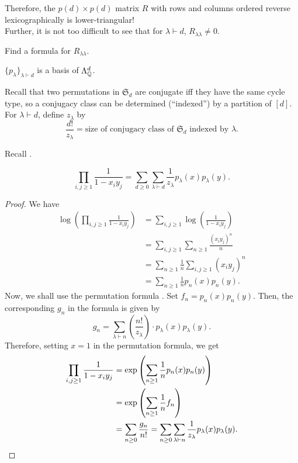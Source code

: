 	Therefore, the $p(d) \times p(d)$ matrix $R$ with rows and columns ordered reverse lexicographically is lower-triangular!\\
	Further, it is not too difficult to see that for $\lambda \vdash d$, $R_{\lambda\lambda} \ne 0$.
	
	\begin{exercise}
		Find a formula for $R_{\lambda\lambda}$.
	\end{exercise}

	\begin{fcor}
		$\{p_\lambda\}_{\lambda \vdash d}$ is a basis of $\Lambda_{\mathbb{Q}}^d$.
	\end{fcor}

	Recall that two permutations in $\mathfrak{S}_d$ are conjugate iff they have the same cycle type, so a conjugacy class can be determined (``indexed'') by a partition of $[d]$. For $\lambda \vdash d$, define $z_\lambda$ by
	\[ \frac{d!}{z_\lambda} = \text{size of conjugacy class of $\mathfrak{S}_d$ indexed by $\lambda$}. \]

	Recall .

	\begin{prop}
		\[ \prod_{i,j \ge 1} \frac{1}{1-x_iy_j} = \sum_{d \ge 0} \sum_{\lambda \vdash d} \frac{1}{z_\lambda} p_\lambda(x) p_\lambda(y). \]
	\end{prop}
	\begin{proof}
		We have
		\begin{align*}
			\log \left( \prod_{i,j \ge 1} \frac{1}{1-x_iy_j} \right) &= \sum_{i,j \ge 1} \log\left( \frac{1}{1-x_iy_j} \right) \\
				&= \sum_{i,j \ge 1} \sum_{n \ge 1} \frac{(x_iy_j)^n}{n} \\
				&= \sum_{n \ge 1} \frac{1}{n} \sum_{i,j \ge 1} (x_iy_j)^n \\
				&= \sum_{n \ge 1} \frac{1}{n} p_n(x)p_n(y).
		\end{align*}
		Now, we shall use the permutation formula . Set $f_n = p_n(x) p_n(y)$. Then, the corresponding $g_n$ in the formula is given by
		\[ g_n = \sum_{\lambda \vdash n} \left( \frac{n!}{z_\lambda} \right) \cdot p_\lambda(x) p_\lambda(y). \]
		Therefore, setting $x = 1$ in the permutation formula, we get
		\begin{align*}
			\prod_{i,j \ge 1} \frac{1}{1-x_iy_j} &= \exp \left( \sum_{n \ge 1} \frac{1}{n} p_n(x) p_n(y) \right) \\
				&= \exp\left( \sum_{n\ge 1} \frac{1}{n} f_n \right) \\
				&= \sum_{n \ge 0} \frac{g_n}{n!} = \sum_{n \ge 0} \sum_{\lambda \vdash n} \frac{1}{z_\lambda} p_\lambda(x) p_\lambda(y). \qedhere
		\end{align*}
	\end{proof}

